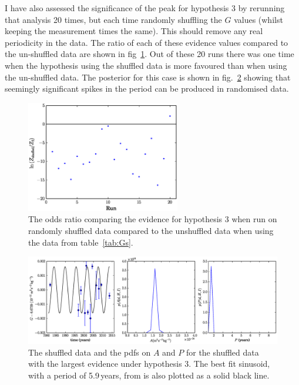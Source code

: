 \documentclass[comment]{epl2}
\begin{document}
I have also assessed the significance of the peak for hypothesis 3 by rerunning that analysis 20 times,
but each time randomly shuffling the $G$ values (whilst keeping the measurement times the same). This should remove
any real periodicity in the data. The ratio of each of these evidence values compared to the un-shuffled data are
shown in fig~\ref{fig:ensemble}. Out of these 20 runs there was one time when the hypothesis using the shuffled data
is more favoured than when using the un-shuffled data. The posterior for this case is shown in fig.~\ref{fig:shuf}
showing that seemingly significant spikes in the period can be produced in randomised data.

\begin{figure}
 \centerline{\includegraphics[width=0.6\textwidth]{ensemble}}
 \caption{The odds ratio comparing the evidence for hypothesis 3 when run on randomly shuffled data compared to
 the unshuffled data when using the data from table~\ref{tab:Gs}.}
 \label{fig:ensemble}
\end{figure}

\begin{figure}
 \centerline{\includegraphics[width=1.0\textwidth]{shuffled}}
 \caption{The shuffled data and the pdfs on $A$ and $P$ for the shuffled data with the largest evidence under
 hypothesis 3. The best fit sinusoid, with a period of 5.9\,years, from \cite{2015EL....11010002A} is also plotted
 as a solid black line.}
 \label{fig:shuf}
\end{figure}
\end{document}
